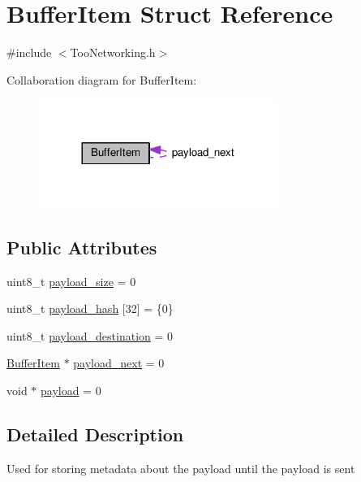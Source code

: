 \hypertarget{structBufferItem}{}\section{Buffer\+Item Struct Reference}
\label{structBufferItem}


{\ttfamily \#include $<$Too\+Networking.\+h$>$}



Collaboration diagram for Buffer\+Item\+:\nopagebreak
\begin{figure}[H]
\begin{center}
\leavevmode
\includegraphics[width=221pt]{structBufferItem__coll__graph}
\end{center}
\end{figure}
\subsection*{Public Attributes}
\begin{DoxyCompactItemize}
\item 
uint8\+\_\+t \hyperlink{structBufferItem_a5c3187c383ceec1825964d5e512273de}{payload\+\_\+size} = 0
\item 
uint8\+\_\+t \hyperlink{structBufferItem_a02298581e8d8eca4589f387ebaeeb14c}{payload\+\_\+hash} \mbox{[}32\mbox{]} = \{0\}
\item 
uint8\+\_\+t \hyperlink{structBufferItem_a2e475a18a6671f1f0c4bf3010d7a6e89}{payload\+\_\+destination} = 0
\item 
\hyperlink{structBufferItem}{Buffer\+Item} $\ast$ \hyperlink{structBufferItem_ae69937bde6391eabc86ea7ec0dffe9cc}{payload\+\_\+next} = 0
\item 
void $\ast$ \hyperlink{structBufferItem_a970332733892ec7bc7ab10a6430fd5e0}{payload} = 0
\end{DoxyCompactItemize}


\subsection{Detailed Description}
Used for storing metadata about the payload until the payload is sent 

